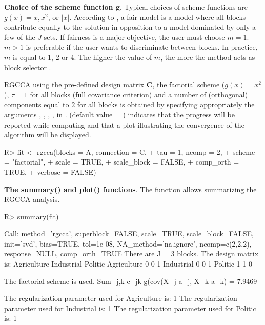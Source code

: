 \documentclass[
]{jss}
\begin{document}
\normalsize

\textbf{Choice of the scheme function g}. Typical choices of scheme
functions are \(g(x) = x, x^2\), or \(\vert x \vert\). According to
\cite{VandeGeer1984}, a fair model is a model where all blocks
contribute equally to the solution in opposition to a model dominated by
only a few of the \(J\) sets. If fairness is a major objective, the user
must choose \(m=1\). \(m>1\) is preferable if the user wants to
discriminate between blocks. In practice, \(m\) is equal to \(1\), \(2\)
or \(4\). The higher the value of \(m\), the more the method acts as
block selector \citep{Tenenhaus2017}.

RGCCA using the pre-defined design matrix \(\mathbf{C}\), the factorial
scheme (\(g(x) = x^2\)), \(\tau = 1\) for all blocks (full covariance
criterion) and a number of (orthogonal) components equal to \(2\) for
all blocks is obtained by specifying appropriately the arguments
, , , ,
 in .  (default value =
) indicates that the progress will be reported while
computing and that a plot illustrating the convergence of the algorithm
will be displayed.

\footnotesize

\begin{CodeChunk}
\begin{CodeInput}
R> fit <- rgcca(blocks = A, connection = C,
+              tau = 1, ncomp = 2,
+              scheme = "factorial",
+              scale = TRUE,
+              scale_block = FALSE,
+              comp_orth = TRUE,
+              verbose = FALSE)
\end{CodeInput}
\end{CodeChunk}

\normalsize

\textbf{The summary() and plot() functions}. The 
function allows summarizing the RGCCA analysis.

\footnotesize

\begin{CodeChunk}
\begin{CodeInput}
R> summary(fit)
\end{CodeInput}
\begin{CodeOutput}
Call: method='rgcca', superblock=FALSE, scale=TRUE, scale_block=FALSE, init='svd',
bias=TRUE, tol=1e-08, NA_method='na.ignore', ncomp=c(2,2,2), response=NULL,
comp_orth=TRUE 
There are J = 3 blocks.
The design matrix is:
            Agriculture Industrial Politic
Agriculture           0          0       1
Industrial            0          0       1
Politic               1          1       0

The factorial scheme is used.
Sum_{j,k} c_jk g(cov(X_j a_j, X_k a_k) = 7.9469 

The regularization parameter used for Agriculture is: 1
The regularization parameter used for Industrial is: 1
The regularization parameter used for Politic is: 1
\end{CodeOutput}
\end{CodeChunk}
\end{document}
